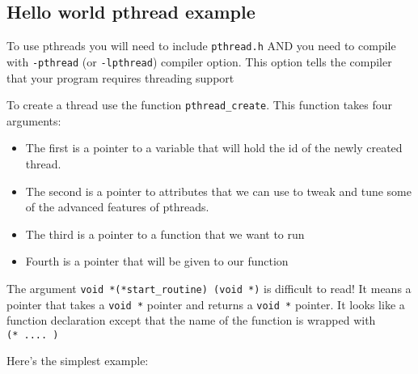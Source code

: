\subsection{Hello world pthread
example}\label{hello-world-pthread-example}

To use pthreads you will need to include \texttt{pthread.h} AND you need
to compile with \texttt{-pthread} (or \texttt{-lpthread}) compiler
option. This option tells the compiler that your program requires
threading support

To create a thread use the function \texttt{pthread\_create}. This
function takes four arguments:

\begin{Shaded}
\begin{Highlighting}[]
  
                     \NormalTok{*), } 
\end{Highlighting}
\end{Shaded}

\begin{itemize}
\itemsep1pt\parskip0pt
\item
  The first is a pointer to a variable that will hold the id of the
  newly created thread.
\item
  The second is a pointer to attributes that we can use to tweak and
  tune some of the advanced features of pthreads.
\item
  The third is a pointer to a function that we want to run
\item
  Fourth is a pointer that will be given to our function
\end{itemize}

The argument \texttt{void\ *(*start\_routine)\ (void\ *)} is difficult
to read! It means a pointer that takes a \texttt{void\ *} pointer and
returns a \texttt{void\ *} pointer. It looks like a function declaration
except that the name of the function is wrapped with
\texttt{(*\ ....\ )}

Here's the simplest example:

\begin{Shaded}
\begin{Highlighting}[]

  
    \NormalTok{);}
     
\NormalTok{\}}
 
    \NormalTok{);}
     \NormalTok{(}\NormalTok{) \{\} }
\NormalTok{\}}
\end{Highlighting}
\end{Shaded}

